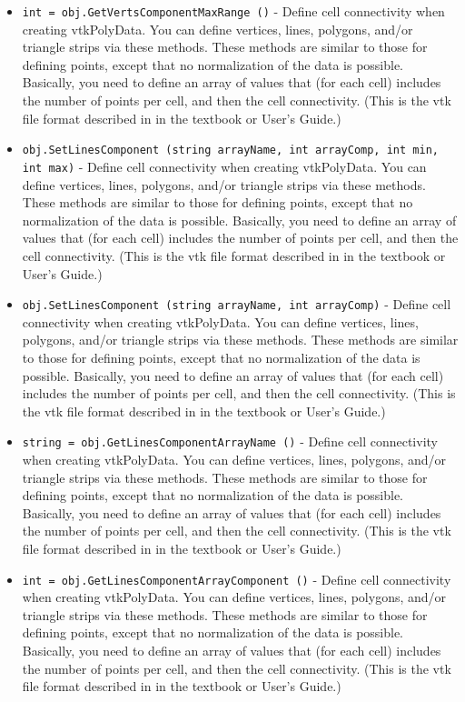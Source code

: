 \begin{itemize}
\item  \verb|int = obj.GetVertsComponentMaxRange ()| -  Define cell connectivity when creating vtkPolyData. You can define
 vertices, lines, polygons, and/or triangle strips via these methods.
 These methods are similar to those for defining points, except
 that no normalization of the data is possible. Basically, you need to
 define an array of values that (for each cell) includes the number of 
 points per cell, and then the cell connectivity. (This is the vtk file 
 format described in in the textbook or User's Guide.)

\item  \verb|obj.SetLinesComponent (string arrayName, int arrayComp, int min, int max)| -  Define cell connectivity when creating vtkPolyData. You can define
 vertices, lines, polygons, and/or triangle strips via these methods.
 These methods are similar to those for defining points, except
 that no normalization of the data is possible. Basically, you need to
 define an array of values that (for each cell) includes the number of 
 points per cell, and then the cell connectivity. (This is the vtk file 
 format described in in the textbook or User's Guide.)

\item  \verb|obj.SetLinesComponent (string arrayName, int arrayComp)| -  Define cell connectivity when creating vtkPolyData. You can define
 vertices, lines, polygons, and/or triangle strips via these methods.
 These methods are similar to those for defining points, except
 that no normalization of the data is possible. Basically, you need to
 define an array of values that (for each cell) includes the number of 
 points per cell, and then the cell connectivity. (This is the vtk file 
 format described in in the textbook or User's Guide.)

\item  \verb|string = obj.GetLinesComponentArrayName ()| -  Define cell connectivity when creating vtkPolyData. You can define
 vertices, lines, polygons, and/or triangle strips via these methods.
 These methods are similar to those for defining points, except
 that no normalization of the data is possible. Basically, you need to
 define an array of values that (for each cell) includes the number of 
 points per cell, and then the cell connectivity. (This is the vtk file 
 format described in in the textbook or User's Guide.)

\item  \verb|int = obj.GetLinesComponentArrayComponent ()| -  Define cell connectivity when creating vtkPolyData. You can define
 vertices, lines, polygons, and/or triangle strips via these methods.
 These methods are similar to those for defining points, except
 that no normalization of the data is possible. Basically, you need to
 define an array of values that (for each cell) includes the number of 
 points per cell, and then the cell connectivity. (This is the vtk file 
 format described in in the textbook or User's Guide.)


\end{itemize}
